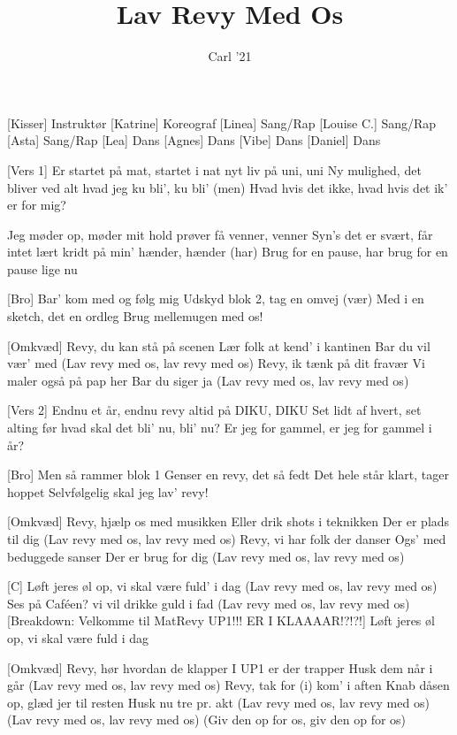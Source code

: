 \documentclass[a4paper,11pt]{article}
\title{Lav Revy Med Os}
\author{Carl '21}
\begin{document}
\maketitle

\begin{roles}
[Kisser] Instruktør
[Katrine] Koreograf
[Linea] Sang/Rap
[Louise C.] Sang/Rap
[Asta] Sang/Rap
[Lea] Dans
[Agnes] Dans
[Vibe] Dans
[Daniel] Dans
\end{roles}

\begin{song}
[Vers 1] Er startet på mat, startet i nat
    nyt liv på uni, uni
    Ny mulighed, det bliver ved
    alt hvad jeg ku bli', ku bli'
    (men) Hvad hvis det ikke,
    hvad hvis det ik' er for mig?

    Jeg møder op, møder mit hold
    prøver få venner, venner
    Syn's det er svært, får intet lært
    kridt på min' hænder, hænder
    (har) Brug for en pause,
    har brug for en pause lige nu

[Bro] Bar' kom med og følg mig
    Udskyd blok 2, tag en omvej
    (vær) Med i en sketch, det en ordleg
    Brug mellemugen med os!


[Omkvæd] Revy, du kan stå på scenen
    Lær folk at kend' i kantinen
    Bar du vil vær' med
    (Lav revy med os, lav revy med os)
    Revy, ik tænk på dit fravær
    Vi maler også på pap her
    Bar du siger ja
    (Lav revy med os, lav revy med os)


[Vers 2] Endnu et år, endnu revy
    altid på DIKU, DIKU
    Set lidt af hvert, set alting før
    hvad skal det bli' nu, bli' nu?
    Er jeg for gammel,
    er jeg for gammel i år?

[Bro] Men så rammer blok 1
    Genser en revy, det så fedt
    Det hele står klart, tager hoppet
    Selvfølgelig skal jeg lav' revy!

[Omkvæd] Revy, hjælp os med musikken
    Eller drik shots i teknikken
    Der er plads til dig
    (Lav revy med os, lav revy med os)
    Revy, vi har folk der danser
    Ogs' med beduggede sanser
    Der er brug for dig
    (Lav revy med os, lav revy med os)

[C] Løft jeres øl op, vi skal være fuld' i dag
    (Lav revy med os, lav revy med os)
    Ses på Caféen? vi vil drikke guld i fad
    (Lav revy med os, lav revy med os)
    [Breakdown: Velkomme til MatRevy UP1!!! ER I KLAAAAR!?!?!]
    Løft jeres øl op, vi skal være fuld i dag

[Omkvæd] Revy, hør hvordan de klapper
    I UP1 er der trapper
    Husk dem når i går
    (Lav revy med os, lav revy med os)
    Revy, tak for (i) kom' i aften
    Knab dåsen op, glæd jer til resten
    Husk nu tre pr. akt
    (Lav revy med os, lav revy med os)
    (Lav revy med os, lav revy med os)
    (Giv den op for os, giv den op for os)
\end{song}
\end{document}
